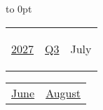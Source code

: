 \vbox to 0pt{}


\pagebreak
{\noindent\Large\renewcommand{\arraystretch}{\myNumArrayStretch}\begin{tabular}{|l|l|l}
\hyperlink{2027}{2027} & \hyperlink{Q3}{Q3} & \hypertarget{July}{July}
\end{tabular}\hfill%
\begin{tabular}{r|r@{}}
\hyperlink{June}{June} & \hyperlink{August}{August}
\end{tabular}}
\myLineThick\medskip

{%

\setlength{\tabcolsep}{\myLenTabColSep}%
%
\begin{tabularx}{\linewidth}{|l!{\vrule width \myLenLineThicknessThick}*{7}{@{}X@{}|}}
  

\end{tabularx}}
